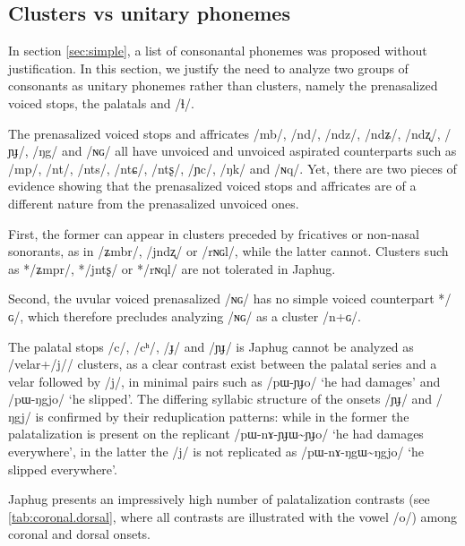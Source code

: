 \documentclass[oldfontcommands,oneside,a4paper,11pt]{article}
\newcommand{\ipa}[1]{{\phon/#1/}} %
\begin{document}
      \subsection{Clusters vs unitary phonemes} \label{sec:non.clusters}
      In section \ref{sec:simple}, a list of consonantal phonemes was proposed without justification. In this section, we justify the need to analyze two groups of consonants as unitary phonemes rather than clusters, namely the prenasalized voiced stops, the palatals and \ipa{ɬ}.
      
      
      The prenasalized voiced stops and affricates \ipa{mb}, \ipa{nd}, \ipa{ndz}, \ipa{ndʑ}, \ipa{ndʐ}, \ipa{ɲɟ}, \ipa{ŋg} and \ipa{ɴɢ} all have unvoiced and unvoiced aspirated counterparts such as \ipa{mp}, \ipa{nt}, \ipa{nts}, \ipa{ntɕ}, \ipa{ntʂ}, \ipa{ɲc}, \ipa{ŋk} and \ipa{ɴq}. Yet, there are two pieces of evidence showing that the prenasalized voiced stops and affricates are of a different nature from the prenasalized unvoiced ones. 
      
      First, the former can appear in clusters preceded by fricatives or non-nasal sonorants, as in \ipa{ʑmbr}, \ipa{jndʐ} or \ipa{rɴɢl}, while the latter cannot. Clusters such as *\ipa{ʑmpr}, *\ipa{jntʂ} or *\ipa{rɴql} are not tolerated in Japhug.
      
Second, the uvular voiced prenasalized \ipa{ɴɢ} has no simple voiced counterpart *\ipa{ɢ}, which therefore precludes analyzing \ipa{ɴɢ} as a cluster \ipa{n+ɢ}.
      


The palatal stops \ipa{c}, \ipa{cʰ}, \ipa{ɟ} and \ipa{ɲɟ} is Japhug cannot be analyzed as /velar+\ipa{j}/ clusters, as a clear contrast exist between the palatal series and a velar followed by \ipa{j}, in minimal pairs such as   \ipa{pɯ-ɲɟo} `he had damages' and \ipa{pɯ-ŋgjo} `he slipped'. The differing syllabic structure of the onsets \ipa{ɲɟ} and \ipa{ŋgj} is confirmed by their reduplication patterns: while in the former the palatalization is present on the replicant \ipa{pɯ-nɤ-ɲɟɯ\textasciitilde{}ɲɟo} `he had damages everywhere', in the latter the \ipa{j} is not replicated as  \ipa{pɯ-nɤ-ŋgɯ\textasciitilde{}ŋgjo} `he slipped everywhere'.
      
      Japhug   presents an impressively high number of palatalization contrasts (see \ref{tab:coronal.dorsal}, where all contrasts are illustrated with the vowel \ipa{o}) among coronal and dorsal onsets. 
      
\end{document}
